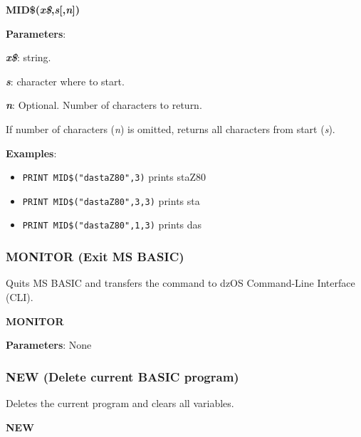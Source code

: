     \hspace{1.9cm}\textbf{MID\$(\textit{x\$},\textit{s}[,\textit{n}])}

    \textbf{Parameters}:

    \hspace{1cm}\textbf{\textit{x\$}}: string.

    \hspace{1cm}\textbf{\textit{s}}: character where to start.

    \hspace{1cm}\textbf{\textit{n}}: Optional. Number of characters to return.

    If number of characters (\textit{n}) is omitted, returns all characters from
    start (\textit{s}).

    \textbf{Examples}:
    \begin{itemize}
        \item \texttt{PRINT MID\$("dastaZ80",3)} prints staZ80
        \item \texttt{PRINT MID\$("dastaZ80",3,3)} prints sta
        \item \texttt{PRINT MID\$("dastaZ80",1,3)} prints das
    \end{itemize}

    \subsubsection{{MONITOR (Exit MS BASIC)}}
    \label{msbasic:lang:monitor}
    Quits MS BASIC and transfers the command to dzOS Command-Line Interface (CLI).

    \hspace{1.9cm}\textbf{MONITOR}

    \textbf{Parameters}: None

    \subsubsection{{NEW (Delete current BASIC program)}}
    \label{msbasic:lang:new}
    Deletes the current program and clears all variables.

    \hspace{1.9cm}\textbf{NEW}

